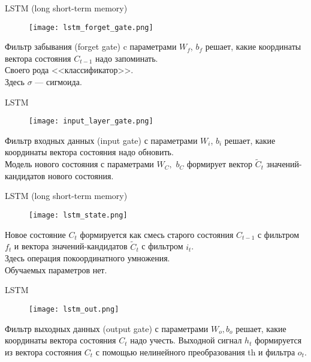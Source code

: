 \documentclass[unicode,9pt, pdf]{beamer}
\begin{document}
	\begin{frame}{LSTM (long short-term memory)}
	    \begin{figure}[h]
	        \begin{center}
		        \texttt{[image: lstm\_forget\_gate.png]}
	        \end{center}
        \end{figure}
        Фильтр забывания (forget gate) c параметрами $W_f$, $b_f$ решает, какие координаты вектора состояния $C_{t-1}$ надо запоминать.\\ Своего рода <<классификатор>>. \\
        Здесь $\sigma$ --- сигмоида.
	\end{frame}
	\begin{frame}{LSTM}
	    \begin{figure}[h]
	        \begin{center}
		        \texttt{[image: input\_layer\_gate.png]}
	        \end{center}
        \end{figure}
        Фильтр входных данных (input gate) с параметрами $W_i$, $b_i$ решает, какие координаты вектора состояния надо обновить. \\
        \vspace{0.5cm}
        Модель нового состояния с параметрами $W_C,$ $b_C$ формирует вектор $\widetilde{C}_t$ значений-кандидатов нового состояния.
	\end{frame}
	\begin{frame}{LSTM (long short-term memory)}
	    \begin{figure}[h]
	        \begin{center}
		        \texttt{[image: lstm\_state.png]}
	        \end{center}
        \end{figure}
    Новое состояние $C_t$ формируется как смесь старого состояния $C_{t-1}$ с фильтром $f_t$ и вектора значений-кандидатов $\widetilde{C}_t$ с фильтром $i_t$.\\
    Здесь операция покоординатного умножения. \\
    \vspace{0.5cm}
    Обучаемых параметров нет.
	\end{frame}
	
	\begin{frame}{LSTM}
	    \begin{figure}[h]
	        \begin{center}
		        \texttt{[image: lstm\_out.png]}
	        \end{center}
        \end{figure}
        Фильтр выходных данных (output gate) с параметрами $W_o, b_o$ решает, какие координаты вектора состояния $C_t$ надо учесть. 
        \vspace{0.5cm}
        Выходной сигнал $h_t$ формируется из вектора состояния $C_t$ с помощью нелинейного преобразования th и фильтра $o_t$.
	\end{frame}
	
\end{document}
